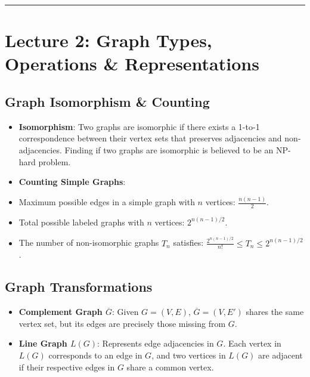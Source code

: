 \documentclass[
]{book}
\theoremstyle{definition}
\theoremstyle{definition}
\theoremstyle{definition}
\theoremstyle{definition}
\theoremstyle{remark}
\begin{document}
\begin{center}\rule{0.5\linewidth}{0.5pt}\end{center}

\section{Lecture 2: Graph Types, Operations \& Representations}\label{lecture-2-graph-types-operations-representations}

\subsection{Graph Isomorphism \& Counting}\label{graph-isomorphism-counting}

\begin{itemize}
\item
  \textbf{Isomorphism}: Two graphs are isomorphic if there exists a 1-to-1 correspondence between their vertex sets that preserves adjacencies and non-adjacencies. Finding if two graphs are isomorphic is believed to be an NP-hard problem.
\item
  \textbf{Counting Simple Graphs}:
\item
  Maximum possible edges in a simple graph with \(n\) vertices: \(\frac{n(n-1)}{2}\).
\item
  Total possible labeled graphs with \(n\) vertices: \(2^{n(n-1)/2}\).
\item
  The number of non-isomorphic graphs \(T_n\) satisfies: \(\frac{2^{n(n-1)/2}}{n!} \le T_n \le 2^{n(n-1)/2}\).
\end{itemize}

\subsection{Graph Transformations}\label{graph-transformations}

\begin{itemize}
\item
  \textbf{Complement Graph \(\overline{G}\)}: Given \(G=(V,E)\), \(\overline{G}=(V, E')\) shares the same vertex set, but its edges are precisely those missing from \(G\).
\item
  \textbf{Line Graph \(L(G)\)}: Represents edge adjacencies in \(G\). Each vertex in \(L(G)\) corresponds to an edge in \(G\), and two vertices in \(L(G)\) are adjacent if their respective edges in \(G\) share a common vertex.
\end{itemize}
\end{document}
